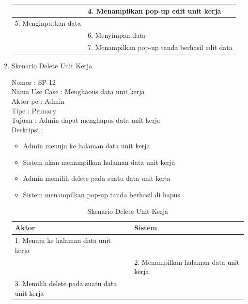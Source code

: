 \begin{enumerate}
\begin{table}
\begin{tabular}{ | p{55mm} | p{70mm} |}
		\hline
		
		& 4.	Menampilkan pop-up edit unit kerja \\
		
		\hline
		
		5.	Menginputkan data  & \\
		\hline
		
		& 6.	Menyimpan data \\
		\hline
		
		& 7.	Menampilkan pop-up tanda berhasil edit data \\
		\hline
		
	\end{tabular}
\end{table}

\item Skenario Delete Unit Kerja

Nomor \kern 3.6pc : SP-12 \\
Nama Use Case : Menghaous data unit kerja \\
Aktor  pc : Admin \\
Tipe \kern 4.6pc : Primary \\
Tujuan \kern 3.6pc : Admin dapat menghapus data unit kerja \\
Deskripsi \kern 2.5pc : 

\begin{itemize}
	\item Admin menuju ke halaman data unit kerja
	\item Sistem akan menampilkan halaman data unit kerja
	\item Admin memilih delete pada suatu data unit kerja
	\item Sistem menampilkan pop-up tanda berhasil di hapus
	
\end{itemize}

\begin{table}
	\caption{Skenario Delete Unit Kerja}
	\centering
	\begin{tabular}{ | p{55mm} | p{70mm} |}
		\hline 
		\textbf{Aktor} & \textbf{Sistem} \\
		\hline
		
		1.	Menuju ke halaman data unit kerja &  \\
		
		\hline
		
		&  2.	Menampilkan halaman data unit kerja \\
		
		\hline
		
		3. Memilih delete pada suatu data unit kerja & \\
		

\end{tabular}
\end{table}
\end{enumerate}
